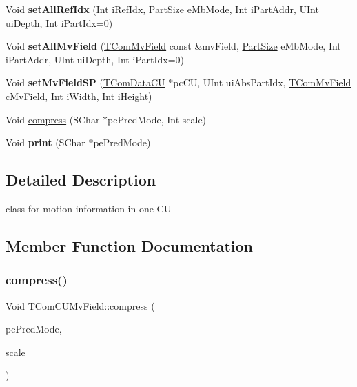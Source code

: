 \begin{DoxyCompactItemize}
\item 
\mbox{\label{class_t_com_c_u_mv_field_af05197cef1e2813fe55db938d4383d13}} 
Void {\bfseries set\+All\+Ref\+Idx} (Int i\+Ref\+Idx, \hyperlink{_type_def_8h_a0093b7809f3cfae06fda9d67441267bd}{Part\+Size} e\+Mb\+Mode, Int i\+Part\+Addr, U\+Int ui\+Depth, Int i\+Part\+Idx=0)
\item 
\mbox{\label{class_t_com_c_u_mv_field_a9adfed6589ce3fd585b9c90a58012fc0}} 
Void {\bfseries set\+All\+Mv\+Field} (\hyperlink{class_t_com_mv_field}{T\+Com\+Mv\+Field} const \&mv\+Field, \hyperlink{_type_def_8h_a0093b7809f3cfae06fda9d67441267bd}{Part\+Size} e\+Mb\+Mode, Int i\+Part\+Addr, U\+Int ui\+Depth, Int i\+Part\+Idx=0)
\item 
\mbox{\label{class_t_com_c_u_mv_field_af256f3fbd8f6e9e23487415345c6daad}} 
Void {\bfseries set\+Mv\+Field\+SP} (\hyperlink{class_t_com_data_c_u}{T\+Com\+Data\+CU} $\ast$pc\+CU, U\+Int ui\+Abs\+Part\+Idx, \hyperlink{class_t_com_mv_field}{T\+Com\+Mv\+Field} c\+Mv\+Field, Int i\+Width, Int i\+Height)
\item 
Void \hyperlink{class_t_com_c_u_mv_field_a645ec19d78c32698e522dacc305792df}{compress} (S\+Char $\ast$pe\+Pred\+Mode, Int scale)
\item 
\mbox{\label{class_t_com_c_u_mv_field_aa5a89d48a83b709f066994572f98408d}} 
Void {\bfseries print} (S\+Char $\ast$pe\+Pred\+Mode)
\end{DoxyCompactItemize}


\subsection{Detailed Description}
class for motion information in one CU 

\subsection{Member Function Documentation}
\mbox{\label{class_t_com_c_u_mv_field_a645ec19d78c32698e522dacc305792df}} 
\subsubsection{\texorpdfstring{compress()}{compress()}}
{\footnotesize\ttfamily Void T\+Com\+C\+U\+Mv\+Field\+::compress (\begin{DoxyParamCaption}\item[{S\+Char $\ast$}]{pe\+Pred\+Mode,  }\item[{Int}]{scale }\end{DoxyParamCaption})}

